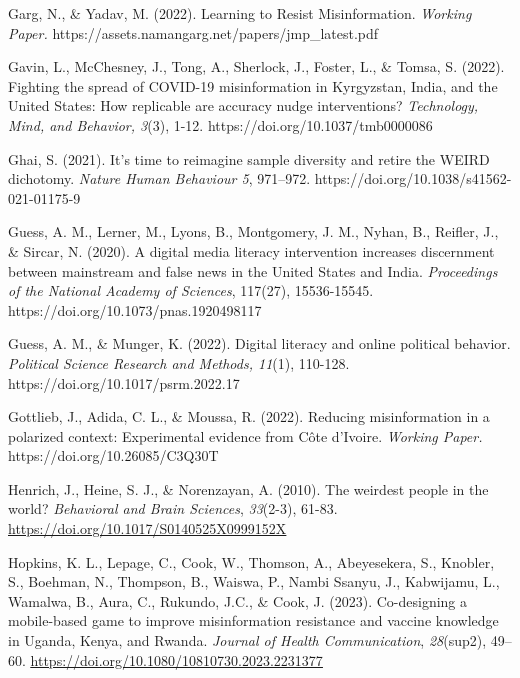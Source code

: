 \documentclass[authordate, empirical]{jote-new-article}
\begin{document}
	Garg, N., \& Yadav, M. (2022). Learning to Resist Misinformation. \emph{Working Paper. }https://assets.namangarg.net/papers/jmp\_latest.pdf



	Gavin, L., McChesney, J., Tong, A., Sherlock, J., Foster, L., \& Tomsa, S. (2022). Fighting the spread of COVID-19 misinformation in Kyrgyzstan, India, and the United States: How replicable are accuracy nudge interventions? \emph{Technology, Mind, and Behavior, 3}(3), 1-12. https://doi.org/10.1037/tmb0000086



	Ghai, S. (2021). It's time to reimagine sample diversity and retire the WEIRD dichotomy. \emph{Nature Human Behaviour 5}, 971--972. https://doi.org/10.1038/s41562-021-01175-9



	Guess, A. M., Lerner, M., Lyons, B., Montgomery, J. M., Nyhan, B., Reifler, J., \& Sircar, N. (2020). A digital media literacy intervention increases discernment between mainstream and false news in the United States and India. \emph{Proceedings of the National Academy of Sciences}, 117(27), 15536-15545. https://doi.org/10.1073/pnas.1920498117



	Guess, A. M., \& Munger, K. (2022). Digital literacy and online political behavior. \emph{Political Science Research and Methods, 11}(1), 110-128. https://doi.org/10.1017/psrm.2022.17



	Gottlieb, J., Adida, C. L., \& Moussa, R. (2022). Reducing misinformation in a polarized context: Experimental evidence from Côte d'Ivoire. \emph{Working Paper. }https://doi.org/10.26085/C3Q30T



	Henrich, J., Heine, S. J., \& Norenzayan, A. (2010). The weirdest people in the world? \emph{Behavioral and Brain Sciences}, \emph{33}(2-3), 61-83. \href{https://doi.org/10.1017/S0140525X0999152X}{\underline{https://doi.org/10.1017/S0140525X0999152X}}



	Hopkins, K. L., Lepage, C., Cook, W., Thomson, A., Abeyesekera, S., Knobler, S., Boehman, N., Thompson, B., Waiswa, P., Nambi Ssanyu, J., Kabwijamu, L., Wamalwa, B., Aura, C., Rukundo, J.C., \& Cook, J. (2023). Co-designing a mobile-based game to improve misinformation resistance and vaccine knowledge in Uganda, Kenya, and Rwanda. \emph{Journal of Health Communication}, \emph{28}(sup2), 49--60. \href{https://doi.org/10.1080/10810730.2023.2231377}{\underline{https://doi.org/10.1080/10810730.2023.2231377}}
\end{document}
